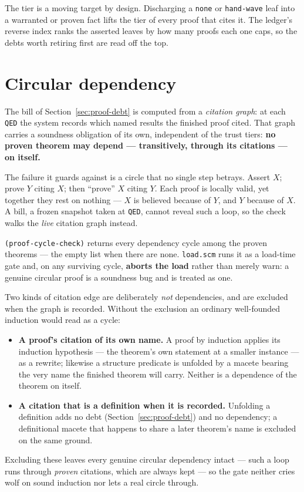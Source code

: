 \begin{remark}
The tier is a moving target by design.  Discharging a \texttt{none} or
\texttt{hand-wave} leaf into a warranted or proven fact lifts the tier of
every proof that cites it.  The ledger's reverse index ranks the asserted
leaves by how many proofs each one caps, so the debts worth retiring
first are read off the top.
\end{remark}

\section{Circular dependency}
\label{sec:proof-cycle}

The bill of Section~\ref{sec:proof-debt} is computed from a \emph{citation
graph}: at each \texttt{QED} the system records which named results the finished
proof cited.  That graph carries a soundness obligation of its own, independent
of the trust tiers: \textbf{no proven theorem may depend --- transitively,
through its citations --- on itself.}

The failure it guards against is a circle that no single step betrays.  Assert
$X$; prove $Y$ citing $X$; then ``prove'' $X$ citing $Y$.  Each proof is locally
valid, yet together they rest on nothing --- $X$ is believed because of $Y$, and
$Y$ because of $X$.  A bill, a frozen snapshot taken at \texttt{QED}, cannot
reveal such a loop, so the check walks the \emph{live} citation graph instead.

\texttt{(proof-cycle-check)} returns every dependency cycle among the proven
theorems --- the empty list when there are none.  \texttt{load.scm} runs it as a
load-time gate and, on any surviving cycle, \textbf{aborts the load} rather than
merely warn: a genuine circular proof is a soundness bug and is treated as one.

Two kinds of citation edge are deliberately \emph{not} dependencies, and are
excluded when the graph is recorded.  Without the exclusion an ordinary
well-founded induction would read as a cycle:

\begin{itemize}
\item \textbf{A proof's citation of its own name.}  A proof by induction applies
  its induction hypothesis --- the theorem's own statement at a smaller
  instance --- as a rewrite; likewise a structure predicate is unfolded by a
  macete bearing the very name the finished theorem will carry.  Neither is a
  dependence of the theorem on itself.
\item \textbf{A citation that is a definition when it is recorded.}  Unfolding a
  definition adds no debt (Section~\ref{sec:proof-debt}) and no dependency; a
  definitional macete that happens to share a later theorem's name is excluded
  on the same ground.
\end{itemize}

\noindent
Excluding these leaves every genuine circular dependency intact --- such a loop
runs through \emph{proven} citations, which are always kept --- so the gate
neither cries wolf on sound induction nor lets a real circle through.


